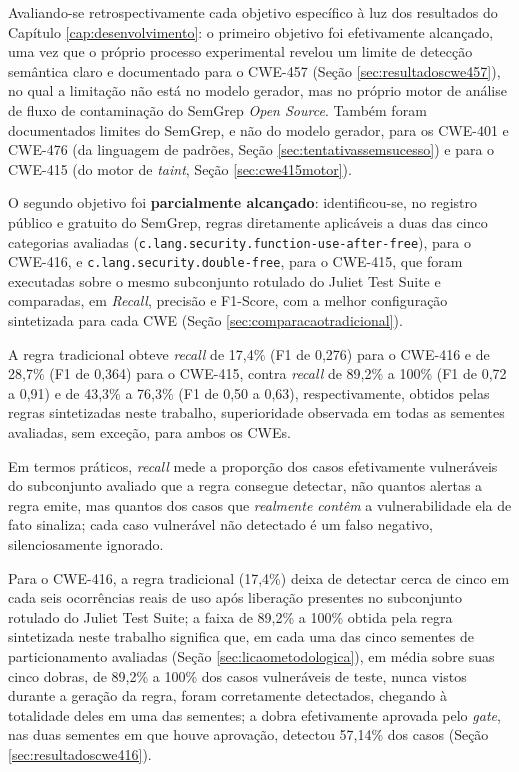 \documentclass[
    12pt,                %
    openright,           %
    oneside,             %
    a4paper,             %
    english,             %
    brazil               %
]{abntex2}
\begin{document}
\par
Avaliando-se retrospectivamente cada objetivo específico à luz dos resultados do Capítulo \ref{cap:desenvolvimento}: o primeiro objetivo foi efetivamente alcançado, uma vez que o próprio processo experimental revelou um limite de detecção semântica claro e documentado para o CWE-457 (Seção \ref{sec:resultadoscwe457}), no qual a limitação não está no modelo gerador, mas no próprio motor de análise de fluxo de contaminação do SemGrep \textit{Open Source}.
Também foram documentados limites do SemGrep, e não do modelo gerador, para os CWE-401 e CWE-476 (da linguagem de padrões, Seção \ref{sec:tentativassemsucesso}) e para o CWE-415 (do motor de \textit{taint}, Seção \ref{sec:cwe415motor}).
\par
O segundo objetivo foi \textbf{parcialmente alcançado}: identificou-se, no registro público e gratuito do SemGrep, regras diretamente aplicáveis a duas das cinco categorias avaliadas (\texttt{c.lang.security.function-use-after-free}), para o CWE-416, e \texttt{c.lang.security.double-free}, para o CWE-415, que foram executadas sobre o mesmo subconjunto rotulado do Juliet Test Suite e comparadas, em \textit{Recall}, precisão e F1-Score, com a melhor configuração sintetizada para cada CWE (Seção \ref{sec:comparacaotradicional}).
\par
A regra tradicional obteve \textit{recall} de 17,4\% (F1 de 0,276) para o CWE-416 e de 28,7\% (F1 de 0,364) para o CWE-415, contra \textit{recall} de 89,2\% a 100\% (F1 de 0,72 a 0,91) e de 43,3\% a 76,3\% (F1 de 0,50 a 0,63), respectivamente, obtidos pelas regras sintetizadas neste trabalho, superioridade observada em todas as sementes avaliadas, sem exceção, para ambos os CWEs.
\par
Em termos práticos, \textit{recall} mede a proporção dos casos efetivamente vulneráveis do subconjunto avaliado que a regra consegue detectar, não quantos alertas a regra emite, mas quantos dos casos que \textit{realmente contêm} a vulnerabilidade ela de fato sinaliza; cada caso vulnerável não detectado é um falso negativo, silenciosamente ignorado.
\par
Para o CWE-416, a regra tradicional (17,4\%) deixa de detectar cerca de cinco em cada seis ocorrências reais de uso após liberação presentes no subconjunto rotulado do Juliet Test Suite; a faixa de 89,2\% a 100\% obtida pela regra sintetizada neste trabalho significa que, em cada uma das cinco sementes de particionamento avaliadas (Seção \ref{sec:licaometodologica}), em média sobre suas cinco dobras, de 89,2\% a 100\% dos casos vulneráveis de teste, nunca vistos durante a geração da regra, foram corretamente detectados, chegando à totalidade deles em uma das sementes; a dobra efetivamente aprovada pelo \textit{gate}, nas duas sementes em que houve aprovação, detectou 57,14\% dos casos (Seção \ref{sec:resultadoscwe416}).
\end{document}
